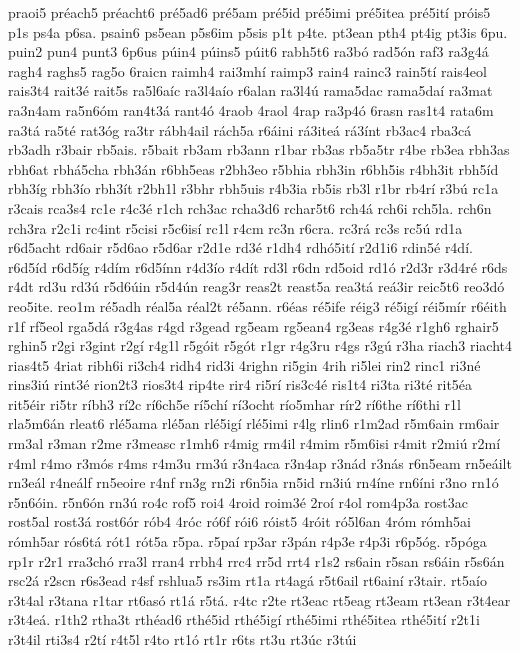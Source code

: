 {praoi5
préach5
préacht6
pré5ad6
pré5am
pré5id
pré5imi
pré5itea
pré5ití
próis5
p1s
ps4a
p6sa.
psain6
ps5ean
p5s6im
p5sis
p1t
p4te.
pt3ean
pth4
pt4ig
pt3is
6pu.
puin2
pun4
punt3
6p6us
púin4
púins5
púit6
rabh5t6
ra3bó
rad5ón
raf3
ra3g4á
ragh4
raghs5
rag5o
6raicn
raimh4
rai3mhí
raimp3
rain4
rainc3
rain5tí
rais4eol
rais3t4
rait3é
rait5s
ra5l6aíc
ra3l4aío
r6alan
ra3l4ú
rama5dac
rama5daí
ra3mat
ra3n4am
ra5n6óm
ran4t3á
rant4ó
4raob
4raol
4rap
ra3p4ó
6rasn
ras1t4
rata6m
ra3tá
ra5té
rat3óg
ra3tr
rábh4ail
rách5a
r6áini
rá3iteá
rá3ínt
rb3ac4
rba3cá
rb3adh
r3bair
rb5ais.
r5bait
rb3am
rb3ann
r1bar
rb3as
rb5a5tr
r4be
rb3ea
rbh3as
rbh6at
rbhá5cha
rbh3án
r6bh5eas
r2bh3eo
r5bhia
rbh3in
r6bh5is
r4bh3it
rbh5íd
rbh3íg
rbh3ío
rbh3ít
r2bh1l
r3bhr
rbh5uis
r4b3ia
rb5is
rb3l
r1br
rb4rí
r3bú
rc1a
r3cais
rca3s4
rc1e
r4c3é
r1ch
rch3ac
rcha3d6
rchar5t6
rch4á
rch6i
rch5la.
rch6n
rch3ra
r2c1i
rc4int
r5cisi
r5c6isí
rc1l
r4cm
rc3n
r6cra.
rc3rá
rc3s
rc5ú
rd1a
r6d5acht
rd6air
r5d6ao
r5d6ar
r2d1e
rd3é
r1dh4
rdhó5ití
r2d1i6
rdin5é
r4dí.
r6d5íd
r6d5íg
r4dím
r6d5ínn
r4d3ío
r4dít
rd3l
r6dn
rd5oid
rd1ó
r2d3r
r3d4ré
r6ds
r4dt
rd3u
rd3ú
r5d6úin
r5d4ún
reag3r
reas2t
reast5a
rea3tá
reá3ir
reic5t6
reo3dó
reo5ite.
reo1m
ré5adh
réal5a
réal2t
ré5ann.
r6éas
ré5ife
réig3
ré5igí
réi5mír
r6éith
r1f
rf5eol
rga5dá
r3g4as
r4gd
r3gead
rg5eam
rg5ean4
rg3eas
r4g3é
r1gh6
rghair5
rghin5
r2gi
r3gint
r2gí
r4g1l
r5góit
r5gót
r1gr
r4g3ru
r4gs
r3gú
r3ha
riach3
riacht4
rias4t5
4riat
ribh6i
ri3ch4
ridh4
rid3i
4righn
ri5gin
4rih
ri5lei
rin2
rinc1
ri3né
rins3iú
rint3é
rion2t3
rios3t4
rip4te
rir4
ri5rí
ris3c4é
ris1t4
ri3ta
ri3té
rit5éa
rit5éir
ri5tr
ríbh3
rí2c
rí6ch5e
rí5chí
rí3ocht
río5mhar
rír2
rí6the
rí6thi
r1l
rla5m6án
rleat6
rlé5ama
rlé5an
rlé5igí
rlé5imi
r4lg
rlin6
r1m2ad
r5m6ain
rm6air
rm3al
r3man
r2me
r3measc
r1mh6
r4mig
rm4il
r4mim
r5m6isi
r4mit
r2miú
r2mí
r4ml
r4mo
r3mós
r4ms
r4m3u
rm3ú
r3n4aca
r3n4ap
r3nád
r3nás
r6n5eam
rn5eáilt
rn3eál
r4neálf
rn5eoire
r4nf
rn3g
rn2i
r6n5ia
rn5id
rn3iú
rn4íne
rn6íni
r3no
rn1ó
r5n6óin.
r5n6ón
rn3ú
ro4c
rof5
roi4
4roid
roim3é
2roí
r4ol
rom4p3a
rost3ac
rost5al
rost3á
rost6ór
rób4
4róc
ró6f
rói6
róist5
4róit
ró5l6an
4róm
rómh5ai
rómh5ar
rós6tá
rót1
rót5a
r5pa.
r5paí
rp3ar
r3pán
r4p3e
r4p3i
r6p5óg.
r5póga
rp1r
r2r1
rra3chó
rra3l
rran4
rrbh4
rrc4
rr5d
rrt4
r1s2
rs6ain
r5san
rs6áin
r5s6án
rsc2á
r2scn
r6s3ead
r4sf
rshlua5
rs3im
rt1a
rt4agá
r5t6ail
rt6ainí
r3tair.
rt5aío
r3t4al
r3tana
r1tar
rt6asó
rt1á
r5tá.
r4tc
r2te
rt3eac
rt5eag
rt3eam
rt3ean
r3t4ear
r3t4eá.
r1th2
rtha3t
rthéad6
rthé5id
rthé5igí
rthé5imi
rthé5itea
rthé5ití
r2t1i
r3t4il
rti3s4
r2tí
r4t5l
r4to
rt1ó
rt1r
r6ts
rt3u
rt3úc
r3túi
}
